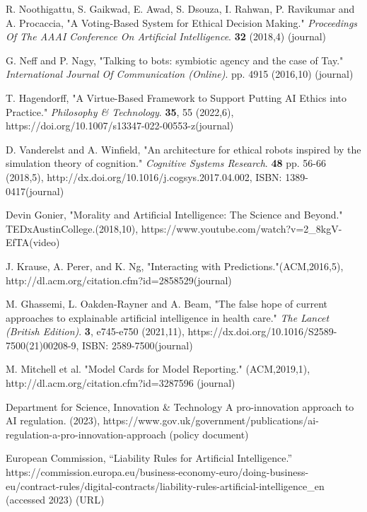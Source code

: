 \documentclass[10pt]{article}
\begin{document}
\begin{thebibliography}{1}
R. Noothigattu, S. Gaikwad, E. Awad, S. Dsouza, I. Rahwan, P. Ravikumar and A. Procaccia, "A Voting-Based System for Ethical Decision Making." {\em Proceedings Of The AAAI Conference On Artificial Intelligence}. \textbf{32} (2018,4) (journal)


G. Neff and P. Nagy, "Talking to bots: symbiotic agency and the case of Tay." {\em International Journal Of Communication (Online)}. pp. 4915 (2016,10) (journal)

T. Hagendorff, "A Virtue-Based Framework to Support Putting AI Ethics into Practice." {\em Philosophy \& Technology}. \textbf{35}, 55 (2022,6), https://doi.org/10.1007/s13347-022-00553-z(journal)


D. Vanderelst and A. Winfield, "An architecture for ethical robots inspired by the simulation theory of cognition." {\em Cognitive Systems Research}. \textbf{48} pp. 56-66 (2018,5), http://dx.doi.org/10.1016/j.cogsys.2017.04.002, ISBN: 1389-0417(journal)


Devin Gonier, "Morality and Artificial Intelligence: The Science and Beyond." TEDxAustinCollege.(2018,10), https://www.youtube.com/watch?v=2\_8kgV-EfTA(video)


J. Krause, A. Perer, and K. Ng, "Interacting with Predictions."(ACM,2016,5), http://dl.acm.org/citation.cfm?id=2858529(journal)

M. Ghassemi, L. Oakden-Rayner and A. Beam, "The false hope of current approaches to explainable artificial intelligence in health care." {\em The Lancet (British Edition)}. \textbf{3}, e745-e750 (2021,11), https://dx.doi.org/10.1016/S2589-7500(21)00208-9, ISBN: 2589-7500(journal)

M. Mitchell et al. "Model Cards for Model Reporting." (ACM,2019,1), http://dl.acm.org/citation.cfm?id=3287596 (journal)


Department for Science, Innovation \& Technology A pro-innovation approach to AI regulation. (2023), https://www.gov.uk/government/publications/ai-regulation-a-pro-innovation-approach (policy document)

European Commission, “Liability Rules for Artificial Intelligence.” https://commission.europa.eu/business-economy-euro/doing-business-eu/contract-rules/digital-contracts/liability-rules-artificial-intelligence\_en (accessed 2023) (URL)

\end{thebibliography}\vspace*{-8pt}
\end{document}
